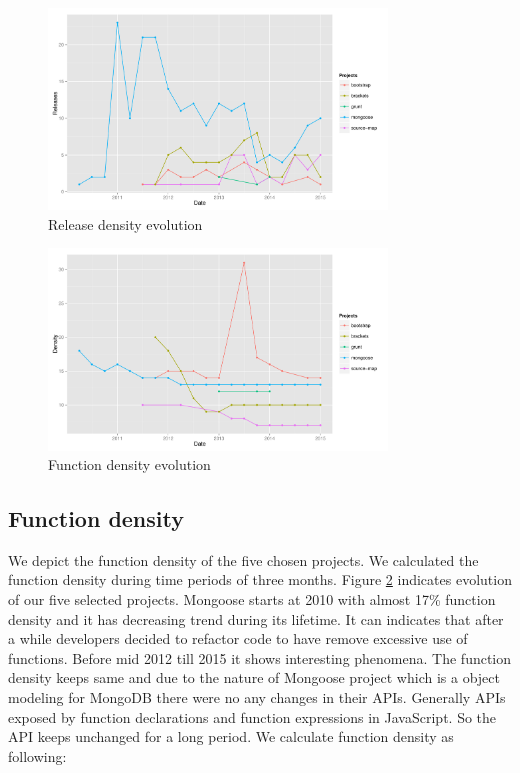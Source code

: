 \begin{figure}[thb!]
	\caption{Release density evolution}
	\label{fig:release_density}
	\includegraphics[width=90mm,scale=0.5]{figures/release_density}
\end{figure}





 \begin{figure}[thb!]
 	\caption{Function density evolution}
 	\label{fig:function_density}
 	\includegraphics[width=90mm,scale=0.5]{figures/function_density}
 \end{figure}


\subsection{Function density}
We depict the function density of the five chosen projects. We calculated the function density during time periods of three months.
Figure \ref{fig:function_density} indicates evolution of our five selected projects. Mongoose starts at 2010 with almost 17\% function density and it has decreasing trend during its lifetime. It can indicates that after a while developers decided to refactor code to have remove excessive use of functions. Before mid 2012 till 2015 it shows interesting phenomena. The function density keeps same and due to the nature of Mongoose project which is a object modeling for MongoDB there were no any changes in their APIs. Generally APIs exposed by function declarations and function expressions in JavaScript. So the API keeps unchanged for a long period. We calculate function density as following:

